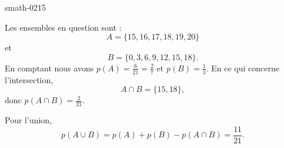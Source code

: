 
\begin{corrige}{smath-0215}

    Les ensembles en question sont :
    \begin{equation}
        A=\{15,16,17,18,19,20\}
    \end{equation}
    et 
    \begin{equation}
        B=\{0,3,6,9,12,15,18\}.
    \end{equation}
    En comptant nous avons \( p(A)=\frac{ 6 }{ 21 }=\frac{ 2 }{ 7 }\) et \( p(B)=\frac{1}{ 3 }\). En ce qui concerne l'intersection,
    \begin{equation}
        A\cap B=\{ 15,18 \},
    \end{equation}
    donc \( p(A\cap B)=\frac{ 2 }{ 21 }\).

    Pour l'union,
    \begin{equation}
        p(A\cup B)=p(A)+p(B)-p(A\cap B)=\frac{ 11 }{ 21 }.
    \end{equation}

\end{corrige}
